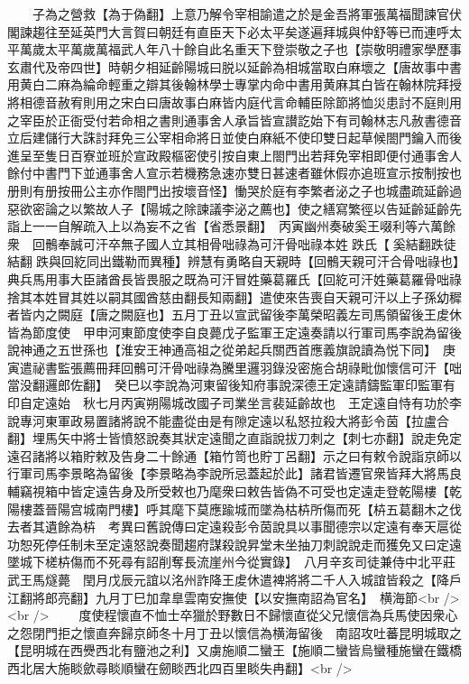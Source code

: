 　　子為之營救【為于偽翻】上意乃解令宰相諭遣之於是金吾將軍張萬福聞諫官伏閣諫趨往至延英門大言賀曰朝廷有直臣天下必太平矣遂遍拜城與仲舒等已而連呼太平萬歲太平萬歲萬福武人年八十餘自此名重天下登崇敬之子也【崇敬明禮家學歷事玄肅代及帝四世】時朝夕相延齡陽城曰脱以延齡為相城當取白麻壞之【唐故事中書用黄白二麻為綸命輕重之辯其後翰林學士專掌内命中書用黄麻其白皆在翰林院拜授將相德音赦宥則用之宋白曰唐故事白麻皆内庭代言命輔臣除節將恤災患討不庭則用之宰臣於正衙受付若命相之書則通事舍人承旨皆宣讃訖始下有司翰林志凡赦書德音立后建儲行大誅討拜免三公宰相命將日並使白麻紙不使印雙日起草候閤門鑰入而後進呈至隻日百寮並班於宣政殿樞密使引按自東上閤門出若拜免宰相即便付通事舍人餘付中書門下並通事舍人宣示若機務急速亦雙日甚速者雖休假亦追班宣示按制按也册則有册按冊公主亦作閤門出按壞音怪】慟哭於庭有李繁者泌之子也城盡疏延齡過惡欲密論之以繁故人子【陽城之除諫議李泌之薦也】使之繕寫繁徑以告延齡延齡先詣上一一自解疏入上以為妄不之省【省悉景翻】　丙寅幽州奏破奚王啜利等六萬餘衆　回鶻奉誠可汗卒無子國人立其相骨咄祿為可汗骨咄祿本姓跌氏【奚結翻跌徒結翻跌與回紇同出鐵勒而異種】辨慧有勇略自天親時【回鶻天親可汗合骨咄祿也】典兵馬用事大臣諸酋長皆畏服之既為可汗冒姓藥葛羅氏【回紇可汗姓藥葛羅骨咄祿捨其本姓冒其姓以嗣其國酋慈由翻長知兩翻】遣使來告喪自天親可汗以上子孫幼穉者皆内之闕庭【唐之闕庭也】五月丁丑以宣武留後李萬榮昭義左司馬領留後王䖍休皆為節度使　甲申河東節度使李自良薨戊子監軍王定遠奏請以行軍司馬李說為留後說神通之五世孫也【淮安王神通高祖之從弟起兵關西首應義旗說讀為悦下同】　庚寅遣祕書監張薦冊拜回鶻可汗骨咄祿為騰里邏羽錄没密施合胡祿毗伽懷信可汗【咄當没翻邏郎佐翻】　癸巳以李說為河東留後知府事說深德王定遠請鑄監軍印監軍有印自定遠始　秋七月丙寅朔陽城改國子司業坐言裴延齡故也　王定遠自恃有功於李說專河東軍政易置諸將說不能盡從由是有隙定遠以私怒拉殺大將彭令茵【拉盧合翻】埋馬矢中將士皆憤怒說奏其狀定遠聞之直詣說拔刀刺之【刺七亦翻】說走免定遠召諸將以箱貯敕及告身二十餘通【箱竹笥也貯丁呂翻】示之曰有敕令說詣京師以行軍司馬李景略為留後【李景略為李說所忌蓋起於此】諸君皆遷官衆皆拜大將馬良輔竊視箱中皆定遠告身及所受敕也乃麾衆曰敕告皆偽不可受也定遠走登乾陽樓【乾陽樓蓋晉陽宫城南門樓】呼其麾下莫應踰城而墜為枯枿所傷而死【枿五葛翻木之伐去者其遺餘為枿　考異曰舊說傳曰定遠殺彭令茵說具以事聞德宗以定遠有奉天扈從功恕死停任制未至定遠怒說奏聞趨府謀殺說昇堂未坐抽刀刺說說走而獲免又曰定遠墜城下槎枿傷而不死尋有詔削奪長流崖州今從實錄】　八月辛亥司徒兼侍中北平莊武王馬燧薨　閏月戊辰元誼以洺州詐降王䖍休遣裨將將二千人入城誼皆殺之【降戶江翻將郎亮翻】九月丁巳加韋臯雲南安撫使【以安撫南詔為官名】　横海節<br />
<br />
　　度使程懷直不恤士卒獵於野數日不歸懷直從父兄懷信為兵馬使因衆心之怨閉門拒之懷直奔歸京師冬十月丁丑以懷信為横海留後　南詔攻吐蕃昆明城取之【昆明城在西㸑西北有鹽池之利】又虜施順二蠻王【施順二蠻皆烏蠻種施蠻在鐵橋西北居大施睒歛尋睒順蠻在劒睒西北四百里睒失冉翻】<br />
